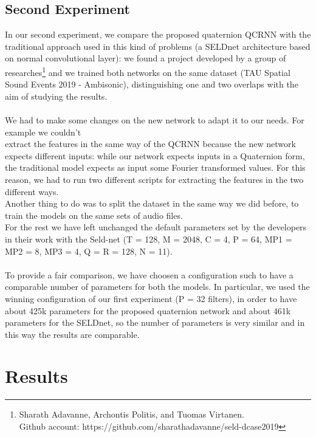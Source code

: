 \documentclass{article}
\begin{document}
    \subsection*{Second Experiment}
    In our second experiment, we compare the proposed quaternion QCRNN with the traditional approach used in this kind of problems 
    (a SELDnet architecture based on normal convolutional layer): we found a project developed by a group of researches\footnote{
        Sharath Adavanne, Archontis Politis, and Tuomas Virtanen. \\Github account: https://github.com/sharathadavanne/seld-dcase2019} 
        and we trained both networks on the same dataset (TAU Spatial Sound Events 2019 - Ambisonic), distinguishing one and two 
        overlaps with the aim of studying the results.\\
    \\
    We had to make some changes on the new network to adapt it to our needs. For example we couldn't \\extract the features in the same
     way of the QCRNN because the new network expects different inputs: while our network expects inputs in a Quaternion form, the 
     traditional model expects as input some Fourier transformed values. For this reason, we had to run two different scripts for 
     extracting the features in the two different ways. \\
    Another thing to do was to split the dataset in the same way we did before, to train the models on the same sets of audio files.\\
    For the rest we have left unchanged the default parameters set by the developers in their work with the Seld-net (T = 128, M = 
    2048, C = 4, P = 64, MP1 = MP2 = 8, MP3 = 4, Q = R = 128, N = 11).\\
	\\
    To provide a fair comparison, we have choosen a configuration such to have a comparable number of parameters for both the models.
    In particular, we used the winning configuration of our first experiment (P = 32 filters), in order to have about 425k parameters 
    for the proposed quaternion network and about 461k parameters for the SELDnet, so the number of parameters is very similar and in 
    this way the results are comparable.
    \section{Results}
\end{document}
